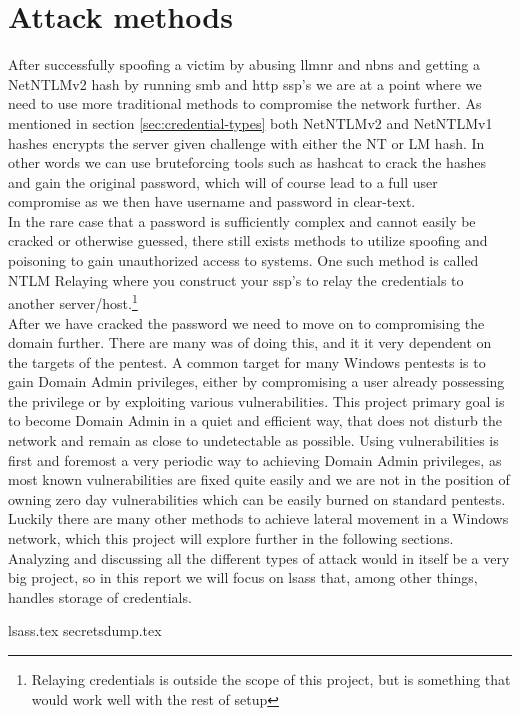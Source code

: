 \documentclass{article}
\begin{document}
\section{Attack methods}
After successfully spoofing a victim by abusing \gls{llmnr} and \gls{nbns} and getting a NetNTLMv2 hash by running \gls{smb} and \gls{http} \gls{ssp}'s we are at a point where we need to use more traditional methods to compromise the network further. As mentioned in section \ref{sec:credential-types} both NetNTLMv2 and NetNTLMv1 hashes encrypts the server given challenge with either the NT or LM hash. In other words we can use bruteforcing tools such as hashcat\cite{url:hashes:hashcat-example-hashes} to crack the hashes and gain the original password, which will of course lead to a full user compromise as we then have username and password in clear-text.
\\
In the rare case that a password is sufficiently complex and cannot easily be cracked or otherwise guessed, there still exists methods to utilize spoofing and poisoning to gain unauthorized access to systems. One such method is called NTLM Relaying\cite{url:ntlm-relaying} where you construct your \gls{ssp}'s to relay the credentials to another server/host.\footnote{Relaying credentials is outside the scope of this project, but is something that would work well with the rest of setup}
\\
After we have cracked the password we need to move on to compromising the domain further. There are many was of doing this, and it it very dependent on the targets of the pentest. A common target for many Windows pentests is to gain Domain Admin privileges, either by compromising a user already possessing the privilege or by exploiting various vulnerabilities. This project primary goal is to become Domain Admin in a quiet and efficient way, that does not disturb the network and remain as close to undetectable as possible. Using vulnerabilities is first and foremost a very periodic way to achieving Domain Admin privileges, as most known vulnerabilities are fixed quite easily and we are not in the position of owning zero day vulnerabilities which can be easily burned on standard pentests. Luckily there are many other methods to achieve lateral movement in a Windows network, which this project will explore further in the following sections. Analyzing and discussing all the different types of attack would in itself be a very big project, so in this report we will focus on \gls{lsass} that, among other things, handles storage of credentials.

{lsass.tex}
{secretsdump.tex}
\end{document}
